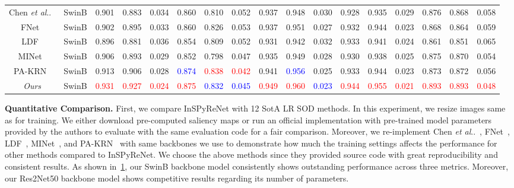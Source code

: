 \documentclass{llncs}
\makeatletter
\DeclareRobustCommand\onedot{\futurelet\@let@token\@onedot}
\def\@onedot{\ifx\@let@token.\else.\null\fi\xspace}
\def\etal{\emph{et al}\onedot}
\newcommand{\rowgray}{\rowcolor{gray!7}}
\makeatother
\begin{document}
\begin{table}
{\begin{tabular}{c|c|ccc|ccc|ccc|ccc|ccc}
            Chen \etal~\cite{chen2018reverse}         & SwinB & 0.901 & 0.883 & 0.034 & 0.860 & 0.810 & 0.052 & 0.937 & 0.948 & 0.030 & 0.928 & 0.935 & 0.029 & 0.876 & 0.868 & 0.058 \\ 
            FNet~\cite{wei2020f3net}       & SwinB & 0.902 & 0.895 & 0.033 & 0.860 & 0.826 & 0.053 & 0.937 & 0.951 & 0.027 & 0.932 & 0.944 & 0.023 & 0.868 & 0.864 & 0.059 \\ 
            LDF~\cite{wei2020label}            & SwinB & 0.896 & 0.881 & 0.036 & 0.854 & 0.809 & 0.052 & 0.931 & 0.942 & 0.032 & 0.933 & 0.941 & 0.024 & 0.861 & 0.851 & 0.065 \\ 
            MINet~\cite{pang2020multi}         & SwinB & 0.906 & 0.893 & 0.029 & 0.852 & 0.798 & 0.047 & 0.935 & 0.949 & 0.028 & 0.930 & 0.938 & 0.025 & 0.875 & 0.870 & 0.054 \\ 
            PA-KRN~\cite{xu2021locate}         & SwinB & 0.913 & 0.906 & 0.028 & \textcolor{blue}{0.874} & \textcolor{red}{0.838} & \textcolor{red}{0.042} & 0.941 & \textcolor{blue}{0.956} & 0.025 & 0.933 & 0.944 & 0.023 & 0.873 & 0.872 & 0.056 \\ 
            \hline
            \rowgray
            \textit{Ours}                                & SwinB & \textcolor{red}{0.931} & \textcolor{red}{0.927} & \textcolor{red}{0.024} & \textcolor{red}{0.875} & \textcolor{blue}{0.832} & \textcolor{blue}{0.045} & \textcolor{red}{0.949} & \textcolor{red}{0.960} & \textcolor{blue}{0.023} & \textcolor{red}{0.944} & \textcolor{red}{0.955} & \textcolor{red}{0.021} & \textcolor{red}{0.893} & \textcolor{red}{0.893} & \textcolor{red}{0.048} \\ 
            \hline\hline



        \end{tabular}}
    \label{tab:2}
\end{table}     
    \label{sec:exp.3}
    \noindent
    \textbf{Quantitative Comparison.} First, we compare InSPyReNet with 12 SotA LR SOD methods. In this experiment, we resize images same as for training.
    We either download pre-computed saliency maps or run an official implementation with pre-trained model parameters provided by the authors to evaluate with the same evaluation code for a fair comparison. 
    Moreover, we re-implement Chen \etal~\cite{chen2018reverse}, FNet~\cite{wei2020f3net}, LDF~\cite{wei2020label}, MINet~\cite{pang2020multi}, and PA-KRN~\cite{xu2021locate} with same backbones we use to demonstrate how much the training settings affects the performance for other methods compared to InSPyReNet.
    We choose the above methods since they provided source code with great reproducibility and consistent results.
    As shown in~\cref{tab:2}, our SwinB backbone model consistently shows outstanding performance across three metrics. 
    Moreover, our Res2Net50 backbone model shows competitive results regarding its number of parameters.
    
\end{document}
